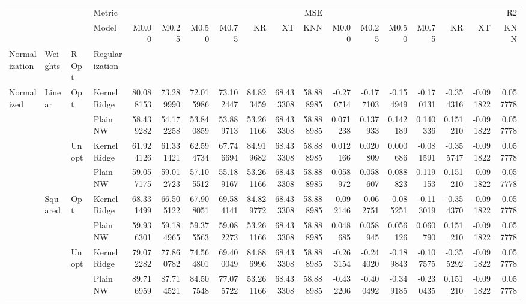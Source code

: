 \begin{tabular}{llllrrrrrrrrrrrrrr}
\toprule
 &  &  & Metric & \multicolumn{7}{r}{MSE} & \multicolumn{7}{r}{R2} \\
 &  &  & Model & M0.00 & M0.25 & M0.50 & M0.75 & KR & XT & KNN & M0.00 & M0.25 & M0.50 & M0.75 & KR & XT & KNN \\
Normalization & Weights & R Opt & Regularization &  &  &  &  &  &  &  &  &  &  &  &  &  &  \\
\midrule
\multirow[t]{8}{*}{Normalized} & \multirow[t]{4}{*}{Linear} & \multirow[t]{2}{*}{Opt} & KernelRidge & 80.088153 & 73.289990 & 72.015986 & 73.102447 & 84.823459 & 68.433308 & 58.888985 & -0.270714 & -0.177103 & -0.154949 & -0.170131 & -0.354316 & -0.091822 & 0.057778 \\
 &  &  & Plain NW & 58.439282 & 54.172258 & 53.840859 & 53.889713 & 53.261166 & 68.433308 & 58.888985 & 0.071238 & 0.137933 & 0.142189 & 0.140336 & 0.151210 & -0.091822 & 0.057778 \\
\cline{3-18}
 &  & \multirow[t]{2}{*}{Unopt} & KernelRidge & 61.924126 & 61.331421 & 62.594734 & 67.746694 & 84.919682 & 68.433308 & 58.888985 & 0.012166 & 0.020809 & 0.000686 & -0.081591 & -0.355747 & -0.091822 & 0.057778 \\
 &  &  & Plain NW & 59.057175 & 59.012723 & 57.105512 & 55.189167 & 53.261166 & 68.433308 & 58.888985 & 0.058972 & 0.058607 & 0.088823 & 0.119153 & 0.151210 & -0.091822 & 0.057778 \\
\cline{2-18} \cline{3-18}
 & \multirow[t]{4}{*}{Squared} & \multirow[t]{2}{*}{Opt} & KernelRidge & 68.331499 & 66.505122 & 67.908051 & 69.584141 & 84.829772 & 68.433308 & 58.888985 & -0.092146 & -0.062751 & -0.085251 & -0.113019 & -0.354370 & -0.091822 & 0.057778 \\
 &  &  & Plain NW & 59.936301 & 59.184965 & 59.375563 & 59.082273 & 53.261166 & 68.433308 & 58.888985 & 0.048685 & 0.058945 & 0.056126 & 0.060790 & 0.151210 & -0.091822 & 0.057778 \\
\cline{3-18}
 &  & \multirow[t]{2}{*}{Unopt} & KernelRidge & 79.072282 & 77.860782 & 74.564801 & 69.400049 & 84.886996 & 68.433308 & 58.888985 & -0.263154 & -0.244020 & -0.189843 & -0.107575 & -0.355292 & -0.091822 & 0.057778 \\
 &  &  & Plain NW & 89.716959 & 87.714521 & 84.507548 & 77.075722 & 53.261166 & 68.433308 & 58.888985 & -0.432206 & -0.400492 & -0.349185 & -0.230435 & 0.151210 & -0.091822 & 0.057778 \\
\cline{1-18} \cline{2-18} \cline{3-18}
\bottomrule
\end{tabular}
